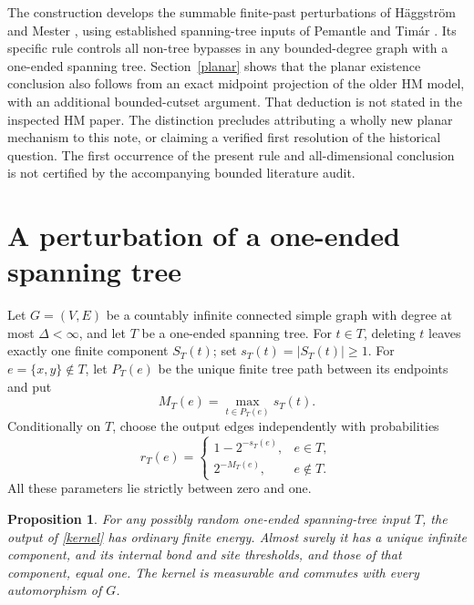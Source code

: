 \documentclass[11pt]{article}
\newtheorem{proposition}[theorem]{Proposition}
\begin{document}
The construction develops the summable finite-past perturbations of H\"aggstr\"om and Mester \cite[Section 2]{HM}, using established spanning-tree inputs of Pemantle and Tim\'ar \cite{P,T}. Its specific rule controls all non-tree bypasses in any bounded-degree graph with a one-ended spanning tree. Section~\ref{planar} shows that the planar existence conclusion also follows from an exact midpoint projection of the older HM model, with an additional bounded-cutset argument. That deduction is not stated in the inspected HM paper. The distinction precludes attributing a wholly new planar mechanism to this note, or claiming a verified first resolution of the historical question. The first occurrence of the present rule and all-dimensional conclusion is not certified by the accompanying bounded literature audit.

\section{A perturbation of a one-ended spanning tree}
Let $G=(V,E)$ be a countably infinite connected simple graph with degree at most $\Delta<\infty$, and let $T$ be a one-ended spanning tree. For $t\in T$, deleting $t$ leaves exactly one finite component $S_T(t)$; set $s_T(t)=|S_T(t)|\ge1$. For $e=\{x,y\}\notin T$, let $P_T(e)$ be the unique finite tree path between its endpoints and put
\[
 M_T(e)=\max_{t\in P_T(e)}s_T(t).
\]
Conditionally on $T$, choose the output edges independently with probabilities
\begin{equation}\label{kernel}
 r_T(e)=
 \begin{cases}
 1-2^{-s_T(e)},&e\in T,\\
 2^{-M_T(e)},&e\notin T.
 \end{cases}
\end{equation}
All these parameters lie strictly between zero and one.

\begin{proposition}\label{kernelprop}
For any possibly random one-ended spanning-tree input $T$, the output of \eqref{kernel} has ordinary finite energy. Almost surely it has a unique infinite component, and its internal bond and site thresholds, and those of that component, equal one. The kernel is measurable and commutes with every automorphism of $G$.
\end{proposition}
\end{document}
